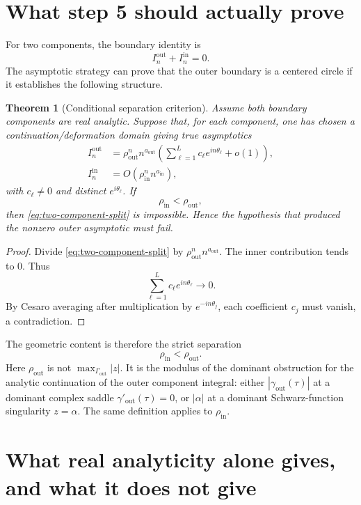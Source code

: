 \documentclass[11pt]{article}
\newtheorem{theorem}{Theorem}[section]
\newcommand{\1}{\mathbf 1}
\begin{document}
\section{What step 5 should actually prove}

For two components, the boundary identity is
\[
  I_n^{\mathrm{out}}+I_n^{\mathrm{in}}=0.
\]
The asymptotic strategy can prove that the outer boundary is a centered circle if it
establishes the following structure.

\begin{theorem}[Conditional separation criterion]\label{thm:conditional-separation}
Assume both boundary components are real analytic. Suppose that, for each component, one
has chosen a continuation/deformation domain giving true asymptotics
\begin{align}
  I_n^{\mathrm{out}}
  &=
  \rho_{\mathrm{out}}^n n^{a_{\mathrm{out}}}
  \left(\sum_{\ell=1}^{L}c_\ell e^{in\theta_\ell}+o(1)\right),
  \label{eq:out-asymp}\\
  I_n^{\mathrm{in}}
  &=
  O\!\left(\rho_{\mathrm{in}}^n n^{a_{\mathrm{in}}}\right),
  \label{eq:in-asymp}
\end{align}
with \(c_\ell\ne0\) and distinct \(e^{i\theta_\ell}\). If
\[
  \rho_{\mathrm{in}}<\rho_{\mathrm{out}},
\]
then \eqref{eq:two-component-split} is impossible. Hence the hypothesis that produced the
nonzero outer asymptotic must fail.
\end{theorem}

\begin{proof}
Divide \eqref{eq:two-component-split} by
\(\rho_{\mathrm{out}}^n n^{a_{\mathrm{out}}}\). The inner contribution tends to \(0\).
Thus
\[
  \sum_{\ell=1}^{L}c_\ell e^{in\theta_\ell}\to0.
\]
By Cesaro averaging after multiplication by \(e^{-in\theta_j}\), each coefficient
\(c_j\) must vanish, a contradiction.
\end{proof}

The geometric content is therefore the strict separation
\[
  \rho_{\mathrm{in}}<\rho_{\mathrm{out}}.
\]
Here \(\rho_{\mathrm{out}}\) is not \(\max_{\Gamma_{\mathrm{out}}}|z|\). It is the modulus
of the dominant obstruction for the analytic continuation of the outer component integral:
either \(|\gamma_{\mathrm{out}}(\tau)|\) at a dominant complex saddle
\(\gamma'_{\mathrm{out}}(\tau)=0\), or \(|\alpha|\) at a dominant Schwarz-function
singularity \(z=\alpha\). The same definition applies to \(\rho_{\mathrm{in}}\).

\section{What real analyticity alone gives, and what it does not give}
\end{document}
